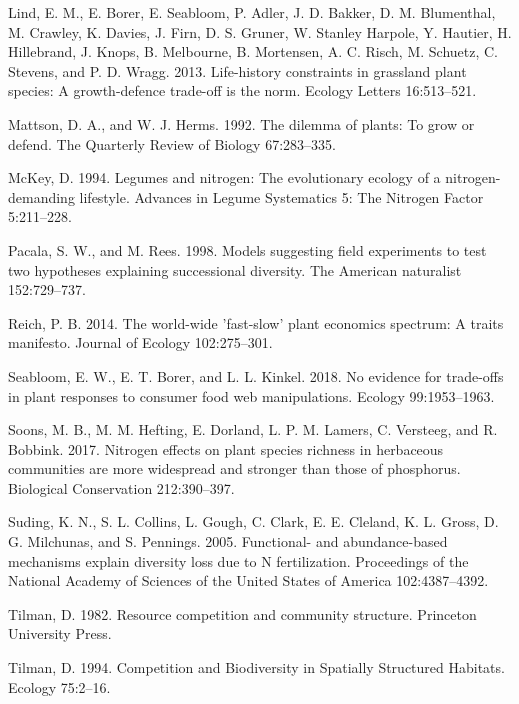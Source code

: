 \documentclass[twoside,12pt,final]{ucthesis-CA2012}
\begin{document}
\begin{ucmainmatter}
\leavevmode\hypertarget{ref-Lind2013}{}%
Lind, E. M., E. Borer, E. Seabloom, P. Adler, J. D. Bakker, D. M. Blumenthal, M. Crawley, K. Davies, J. Firn, D. S. Gruner, W. Stanley Harpole, Y. Hautier, H. Hillebrand, J. Knops, B. Melbourne, B. Mortensen, A. C. Risch, M. Schuetz, C. Stevens, and P. D. Wragg. 2013. Life-history constraints in grassland plant species: A growth-defence trade-off is the norm. Ecology Letters 16:513--521.

\leavevmode\hypertarget{ref-Mattson1992}{}%
Mattson, D. A., and W. J. Herms. 1992. The dilemma of plants: To grow or defend. The Quarterly Review of Biology 67:283--335.

\leavevmode\hypertarget{ref-McKey1994}{}%
McKey, D. 1994. Legumes and nitrogen: The evolutionary ecology of a nitrogen-demanding lifestyle. Advances in Legume Systematics 5: The Nitrogen Factor 5:211--228.

\leavevmode\hypertarget{ref-Pacala1998}{}%
Pacala, S. W., and M. Rees. 1998. Models suggesting field experiments to test two hypotheses explaining successional diversity. The American naturalist 152:729--737.

\leavevmode\hypertarget{ref-Reich2014}{}%
Reich, P. B. 2014. The world-wide 'fast-slow' plant economics spectrum: A traits manifesto. Journal of Ecology 102:275--301.

\leavevmode\hypertarget{ref-Seabloom2018}{}%
Seabloom, E. W., E. T. Borer, and L. L. Kinkel. 2018. No evidence for trade-offs in plant responses to consumer food web manipulations. Ecology 99:1953--1963.

\leavevmode\hypertarget{ref-Soons2017}{}%
Soons, M. B., M. M. Hefting, E. Dorland, L. P. M. Lamers, C. Versteeg, and R. Bobbink. 2017. Nitrogen effects on plant species richness in herbaceous communities are more widespread and stronger than those of phosphorus. Biological Conservation 212:390--397.

\leavevmode\hypertarget{ref-Suding2005}{}%
Suding, K. N., S. L. Collins, L. Gough, C. Clark, E. E. Cleland, K. L. Gross, D. G. Milchunas, and S. Pennings. 2005. Functional- and abundance-based mechanisms explain diversity loss due to N fertilization. Proceedings of the National Academy of Sciences of the United States of America 102:4387--4392.

\leavevmode\hypertarget{ref-tilman1982resource}{}%
Tilman, D. 1982. Resource competition and community structure. Princeton University Press.

\leavevmode\hypertarget{ref-Tilman1994}{}%
Tilman, D. 1994. Competition and Biodiversity in Spatially Structured Habitats. Ecology 75:2--16.


\end{ucmainmatter}
\end{document}
